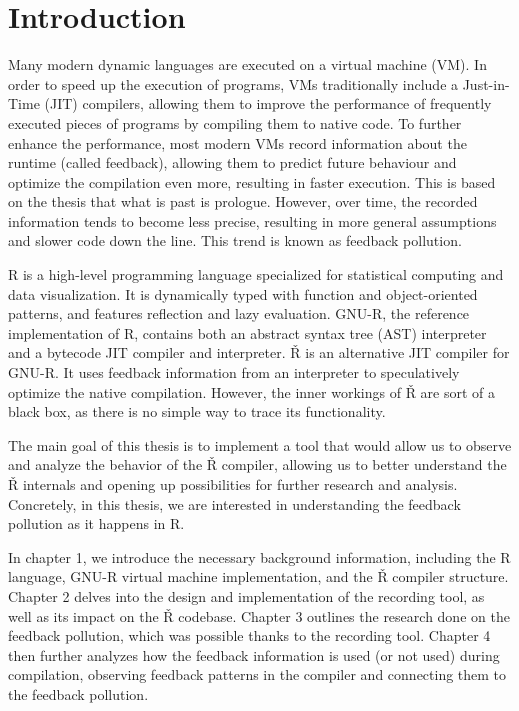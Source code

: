 \chapter*{Introduction}
\setcounter{page}{1}


Many modern dynamic languages are executed on a virtual machine (VM). In order to speed up the execution of programs, VMs traditionally include a Just-in-Time (JIT) compilers, allowing them to improve the performance of frequently executed pieces of programs by compiling them to native code. To further enhance the performance, most modern VMs record information about the runtime (called feedback), allowing them to predict future behaviour and optimize the compilation even more, resulting in faster execution. This is based on the thesis that what is past is prologue. However, over time, the recorded information tends to become less precise, resulting in more general assumptions and slower code down the line. This trend is known as feedback pollution.

R is a high-level programming language specialized for statistical computing and data visualization. It is dynamically typed with function and object-oriented patterns, and features reflection and lazy evaluation. GNU-R, the reference implementation of R, contains both an abstract syntax tree (AST) interpreter and a bytecode JIT compiler and interpreter. Ř is an alternative JIT compiler for GNU-R. It uses feedback information from an interpreter to speculatively optimize the native compilation. However, the inner workings of Ř are sort of a black box, as there is no simple way to trace its functionality. 

The main goal of this thesis is to implement a tool that would allow us to observe and analyze the behavior of the Ř compiler, allowing us to better understand the Ř internals and opening up possibilities for further research and analysis. Concretely, in this thesis, we are interested in understanding the feedback pollution as it happens in R.

In chapter 1, we introduce the necessary background information, including the R language, GNU-R virtual machine implementation, and the Ř compiler structure. Chapter 2 delves into the design and implementation of the recording tool, as well as its impact on the Ř codebase. Chapter 3 outlines the research done on the feedback pollution, which was possible thanks to the recording tool. Chapter 4 then further analyzes how the feedback information is used (or not used) during compilation, observing feedback patterns in the compiler and connecting them to the feedback pollution.

